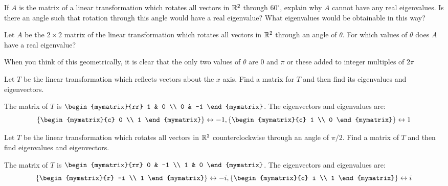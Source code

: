 \begin{enumialphparenastyle}

\begin{ex} If $A$ is the matrix of a linear transformation which rotates all
vectors in $\mathbb{R}^{2}$ through $60^{\circ }$, explain why $A$ cannot
have any real eigenvalues. Is there an angle such that rotation through this
angle would have a real eigenvalue? What eigenvalues would be obtainable in
this way? \vspace{1mm} 
\end{ex}


\begin{ex} Let $A$ be the $2\times 2$ matrix of the linear transformation which
rotates all vectors in $\mathbb{R}^{2}$ through an angle of $\theta$. For
which values of $\theta $ does $A$ have a real eigenvalue? 
\begin{sol}
When you think of this geometrically, it is clear that the only two values
of $\theta $ are 0 and $\pi $ or these added to integer multiples of $2\pi $
\end{sol}
\end{ex}


\begin{ex} Let $T$ be the linear transformation which reflects vectors about
the $x$ axis. Find a matrix for $T$ and then find its eigenvalues and
eigenvectors. 
\begin{sol}
The matrix of $T$ is $\begin{mymatrix}{rr}
1 & 0 \\
0 & -1
\end{mymatrix}$. The eigenvectors and eigenvalues are:
\[
\set{\begin{mymatrix}{c}
0 \\
1
\end{mymatrix} } \leftrightarrow -1,\set{\begin{mymatrix}{c}
1 \\
0
\end{mymatrix} } \leftrightarrow 1
\]
\end{sol}
\end{ex}

\begin{ex} Let $T$ be the linear transformation which rotates all vectors in 
$\mathbb{R}^{2}$ counterclockwise through an angle of $\pi /2$. Find a matrix
of $T$ and then find eigenvalues and eigenvectors.
\begin{sol}
The matrix of $T$ is $\begin{mymatrix}{rr}
0 & -1 \\
1 & 0
\end{mymatrix}$. The eigenvectors and eigenvalues are:
\[
\set{\begin{mymatrix}{r}
-i \\
1
\end{mymatrix} } \leftrightarrow -i,\set{\begin{mymatrix}{c}
i \\
1
\end{mymatrix} } \leftrightarrow i
\]
\end{sol}
\end{ex}


\end{enumialphparenastyle}
